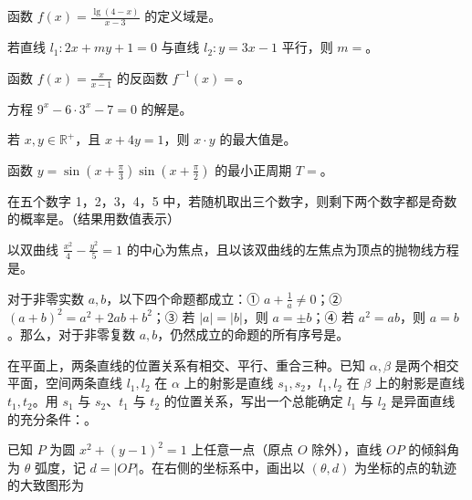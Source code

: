 


\begin{question}
函数 $f(x)=\frac{\lg(4-x)}{x-3}$ 的定义域是\gkblank{}。
\end{question}
\begin{question}
若直线 $l_1:2x+my+1=0$ 与直线 $l_2:y=3x-1$ 平行，则 $m=$\gkblank{}。
\end{question}
\begin{question}
函数 $f(x)=\frac{x}{x-1}$ 的反函数 $f^{-1}(x)=$\gkblank{}。
\end{question}
\begin{question}
方程 $9^x-6\cdot3^x-7=0$ 的解是\gkblank{}。
\end{question}
\begin{question}
若 $x,y\in\mathbb R^+$，且 $x+4y=1$，则 $x\cdot y$ 的最大值是\gkblank{}。
\end{question}
\begin{question}
函数 $y=\sin(x+\frac\pi3)\sin(x+\frac\pi2)$ 的最小正周期 $T=$\gkblank{}。
\end{question}
\begin{question}
在五个数字 1，2，3，4，5 中，若随机取出三个数字，则剩下两个数字都是奇数的概率是\gkblank{}。（结果用数值表示）
\end{question}
\begin{question}
以双曲线 $\frac{x^2}{4}-\frac{y^2}{5}=1$ 的中心为焦点，且以该双曲线的左焦点为顶点的抛物线方程是\gkblank{}。
\end{question}
\begin{question}
对于非零实数 $a,b$，以下四个命题都成立：① $a+\frac1a\ne0$；② $(a+b)^2=a^2+2ab+b^2$；③ 若 $|a|=|b|$，则 $a=\pm b$；④ 若 $a^2=ab$，则 $a=b$。那么，对于非零复数 $a,b$，仍然成立的命题的所有序号是\gkblank{}。
\end{question}
\begin{question}
在平面上，两条直线的位置关系有相交、平行、重合三种。已知 $\alpha,\beta$ 是两个相交平面，空间两条直线 $l_1,l_2$ 在 $\alpha$ 上的射影是直线 $s_1,s_2$，$l_1,l_2$ 在 $\beta$ 上的射影是直线 $t_1,t_2$。用 $s_1$ 与 $s_2$、$t_1$ 与 $t_2$ 的位置关系，写出一个总能确定 $l_1$ 与 $l_2$ 是异面直线的充分条件：\gkblank{}。
\Needspace{0.4\textheight}
\end{question}
\begin{question}
已知 $P$ 为圆 $x^2+(y-1)^2=1$ 上任意一点（原点 $O$ 除外），直线 $OP$ 的倾斜角为 $\theta$ 弧度，记 $d=|OP|$。在右侧的坐标系中，画出以 $(\theta,d)$ 为坐标的点的轨迹的大致图形为 
\nopagebreak[4]
\begin{center}\end{center}
\nopagebreak[4]
\end{question}

